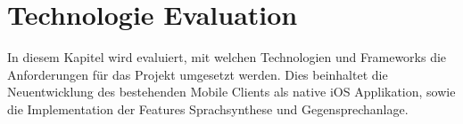 \section{Technologie Evaluation}

In diesem Kapitel wird evaluiert, mit welchen Technologien und Frameworks die Anforderungen für das Projekt umgesetzt werden.
Dies beinhaltet die Neuentwicklung des bestehenden Mobile Clients als native iOS Applikation, sowie die Implementation der Features Sprachsynthese und Gegensprechanlage.




